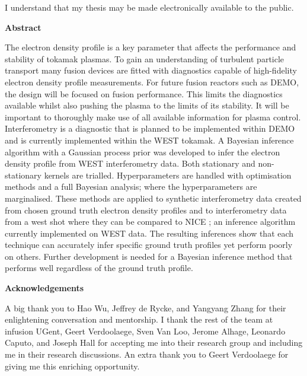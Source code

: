   \noindent
I understand that my thesis may be made electronically available to the public.

\cleardoublepage
{}    %

\begin{center}\textbf{Abstract}\end{center}
The electron density profile is a key parameter that affects the performance and stability of tokamak plasmas. To gain an understanding of turbulent particle transport many fusion devices are fitted with diagnostics capable of high-fidelity electron density profile measurements. For future fusion reactors such as DEMO, the design will be focused on fusion performance. This limits the diagnostics available whilst also pushing the plasma to the limits of its stability. It will be important to thoroughly make use of all available information for plasma control. Interferometry is a diagnostic that is planned to be implemented within DEMO and is currently implemented within the WEST tokamak. A Bayesian inference algorithm with a Gaussian process prior was developed to infer the electron density profile from WEST interferometry data. Both stationary and non-stationary kernels are trialled. Hyperparameters are handled with optimisation methods and a full Bayesian analysis; where the hyperparameters are marginalised. These methods are applied to synthetic interferometry data created from chosen ground truth electron density profiles and to interferometry data from a west shot where they can be compared to NICE \cite{nice}; an inference algorithm currently implemented on WEST data. The resulting inferences show that each technique can accurately infer specific ground truth profiles yet perform poorly on others. Further development is needed for a Bayesian inference method that performs well regardless of the ground truth profile.
\cleardoublepage
{}    %

\begin{center}\textbf{Acknowledgements}\end{center}

A big thank you to Hao Wu, Jeffrey de Rycke, and Yangyang Zhang for their enlightening conversation and mentorship. I thank the rest of the team at infusion UGent, Geert Verdoolaege, Sven Van Loo, Jerome Alhage, Leonardo Caputo, and Joseph Hall for accepting me into their research group and including me in their research discussions. An extra thank you to Geert Verdoolaege for giving me this enriching opportunity.
\cleardoublepage
{}    %

